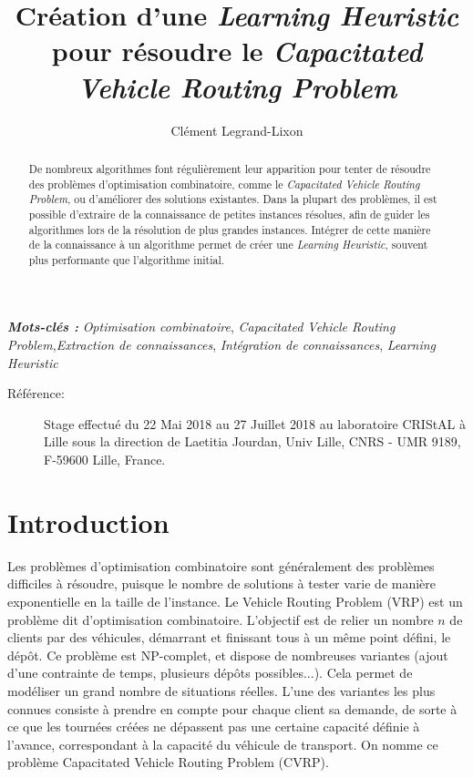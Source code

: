 \documentclass[a4paper,11pt]{article}%
\providecommand{\keywords}[1]{\textbf{\textit{Mots-clés : }} #1}
\begin{document}
\title{Création d'une \emph{Learning Heuristic} pour résoudre le \emph{Capacitated Vehicle Routing Problem}}

\author{Clément Legrand-Lixon}

\maketitle

\begin{abstract}
De nombreux algorithmes font régulièrement leur apparition pour tenter de résoudre des problèmes d'optimisation combinatoire, comme le \emph{Capacitated Vehicle Routing Problem}, ou d'améliorer des solutions existantes.
Dans la plupart des problèmes, il est possible d'extraire de la connaissance de petites instances résolues, afin de guider les algorithmes lors de la résolution de plus grandes instances. Intégrer de cette manière de la connaissance à un algorithme permet de créer une \emph{Learning Heuristic}, souvent plus performante que l'algorithme initial. 
\end{abstract}

\keywords{\emph{Optimisation combinatoire}, \emph{Capacitated Vehicle Routing Problem},\emph{Extraction de connaissances}, \emph{Intégration de connaissances}, \emph{Learning Heuristic}}

\begin{description}
\item[Référence:] Stage effectué du 22 Mai 2018 au 27 Juillet 2018 au laboratoire CRIStAL à Lille sous la direction de Laetitia Jourdan, Univ Lille, CNRS - UMR 9189, F-59600 Lille, France.

\end{description}

\section*{Introduction}

Les problèmes d'optimisation combinatoire sont généralement des problèmes difficiles à résoudre, puisque le nombre de solutions à tester varie de manière exponentielle en la taille de l'instance. 
Le Vehicle Routing Problem (VRP) est un problème dit d'optimisation combinatoire.
L'objectif est de relier un nombre $n$ de clients par des véhicules, démarrant et finissant tous à un même point défini, le dépôt. 
Ce problème est NP-complet, et dispose de nombreuses variantes (ajout d'une contrainte de temps, plusieurs dépôts possibles...). Cela permet de modéliser un grand nombre de situations réelles. 
L'une des variantes les plus connues consiste à prendre en compte pour chaque client sa demande, de sorte à ce que les tournées créées ne dépassent pas une certaine capacité définie à l'avance, correspondant à la capacité du véhicule de transport. 
On nomme ce problème Capacitated Vehicle Routing Problem (CVRP). 
\end{document}
